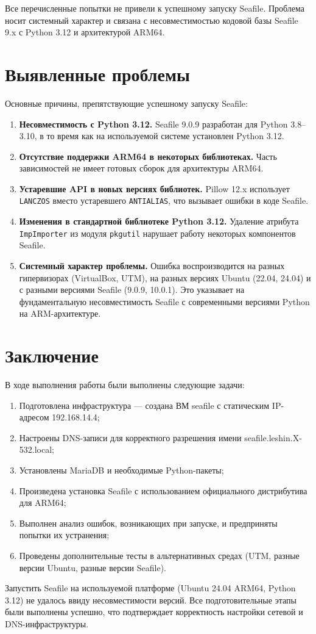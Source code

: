 \documentclass[a4paper,14pt,oneside,openany]{memoir}
\begin{document}
Все перечисленные попытки не привели к успешному запуску Seafile. Проблема носит системный характер и связана с несовместимостью кодовой базы Seafile 9.x с Python 3.12 и архитектурой ARM64.

\section{Выявленные проблемы}

Основные причины, препятствующие успешному запуску Seafile:

\begin{enumerate}
    \item \textbf{Несовместимость с Python 3.12.} Seafile 9.0.9 разработан для Python 3.8–3.10, в то время как на используемой системе установлен Python 3.12.
    \item \textbf{Отсутствие поддержки ARM64 в некоторых библиотеках.} Часть зависимостей не имеет готовых сборок для архитектуры ARM64.
    \item \textbf{Устаревшие API в новых версиях библиотек.} Pillow 12.x использует \texttt{LANCZOS} вместо устаревшего \texttt{ANTIALIAS}, что вызывает ошибки в коде Seafile.
    \item \textbf{Изменения в стандартной библиотеке Python 3.12.} Удаление атрибута \texttt{ImpImporter} из модуля \texttt{pkgutil} нарушает работу некоторых компонентов Seafile.
    \item \textbf{Системный характер проблемы.} Ошибка воспроизводится на разных гипервизорах (VirtualBox, UTM), на разных версиях Ubuntu (22.04, 24.04) и с разными версиями Seafile (9.0.9, 10.0.1). Это указывает на фундаментальную несовместимость Seafile с современными версиями Python на ARM-архитектуре.
\end{enumerate}

\section*{Заключение}

В ходе выполнения работы были выполнены следующие задачи:

\begin{enumerate}
    \item Подготовлена инфраструктура — создана ВМ seafile с статическим IP-адресом 192.168.14.4;
    \item Настроены DNS-записи для корректного разрешения имени seafile.leshin.X-532.local;
    \item Установлены MariaDB и необходимые Python-пакеты;
    \item Произведена установка Seafile с использованием официального дистрибутива для ARM64;
    \item Выполнен анализ ошибок, возникающих при запуске, и предприняты попытки их устранения;
    \item Проведены дополнительные тесты в альтернативных средах (UTM, разные версии Ubuntu, разные версии Seafile).
\end{enumerate}

Запустить Seafile на используемой платформе (Ubuntu 24.04 ARM64, Python 3.12) не удалось ввиду несовместимости версий. Все подготовительные этапы были выполнены успешно, что подтверждает корректность настройки сетевой и DNS-инфраструктуры.
\end{document}
